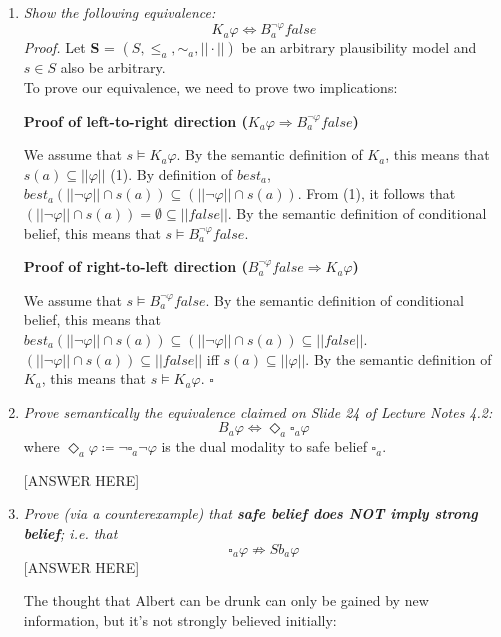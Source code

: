 \documentclass[leqno]{article}
\begin{document}
\begin{enumerate}[label=(\alph*)]
	\item \textit{Show the following equivalence:}
		$$K_a \varphi \Leftrightarrow B_a^{\neg \varphi} false$$
		\textit{Proof.} Let \textbf{S} = $(S, \le_a, \sim_a, ||\cdot||)$ be an 
		arbitrary plausibility model and $s \in S$ also be arbitrary.\\
		To prove our equivalence, we need to prove two implications:
		
		\textbf{Proof of left-to-right direction 
		($K_a \varphi \Rightarrow B_a^{\neg \varphi} false$)}
		
		We assume that $s \models K_a \varphi$. By the semantic definition of $K_a$,
		this means that $s(a) \subseteq ||\varphi||$ (1). By definition of $best_a$, 
		$best_a(||\neg \varphi|| \cap s(a)) \subseteq 
		(||\neg \varphi|| \cap s(a))$. From (1), it follows that 
		$(||\neg \varphi|| \cap s(a)) = \emptyset \subseteq ||false||$. By the 
		semantic definition of conditional belief, this means that 
		$s \models B_a^{\neg \varphi} false$.
		
		\textbf{Proof of right-to-left direction 
		($B_a^{\neg \varphi} false \Rightarrow K_a \varphi$)}
		
		We assume that $s \models B_a^{\neg \varphi} false$. By the semantic 
		definition of conditional belief, this means that 
		$best_a(||\neg \varphi|| \cap s(a)) \subseteq (||\neg \varphi|| \cap s(a)) 
		\subseteq ||false||$. $(||\neg \varphi|| \cap s(a)) \subseteq ||false||$ iff 
		$s(a) \subseteq ||\varphi||$. By the semantic definition of $K_a$, this means
		 that $s \models K_a \varphi$. 
		\hfill $\square$

	\item \textit{Prove semantically the equivalence claimed on Slide 24 of 
		Lecture Notes 4.2:}
		$$B_a \varphi \Leftrightarrow \Diamond_a \square_a \varphi$$
		where $\Diamond_a \varphi \coloneqq \neg \square_a \neg \varphi$ is the dual 
		modality to safe belief $\square_a$.
		
		[ANSWER HERE]
	
	\item \textit{Prove (via a counterexample) that \textbf{safe belief does NOT 
		imply strong belief}; i.e. that}
		$$\square_a \varphi \not\Rightarrow Sb_a \varphi$$
		[ANSWER HERE]
		
		The thought that Albert can be drunk can only be gained by new information, but
		it's not strongly believed initially:
		

\end{enumerate}
\end{document}

